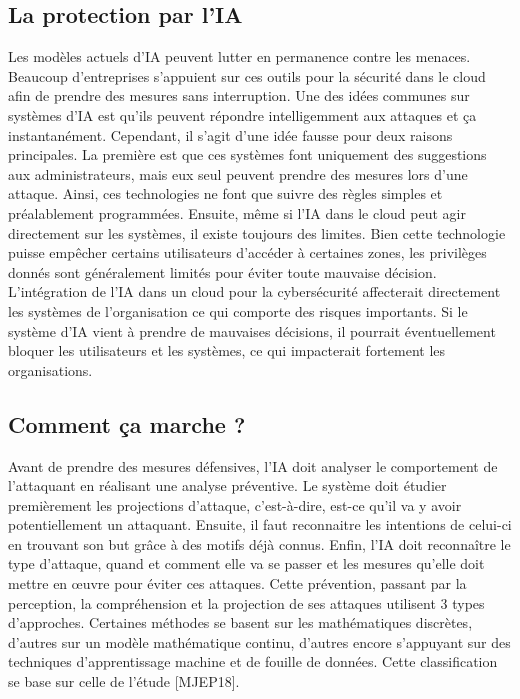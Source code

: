 \documentclass[a4paper, 12pt]{article}
\begin{document}
\begin{spacing}{1.1}
    \subsection{La protection par l'IA}
      Les modèles actuels d'IA peuvent lutter en permanence contre les
      menaces. Beaucoup d’entreprises s'appuient sur ces outils pour la sécurité
      dans le cloud afin de prendre des mesures sans interruption. Une des idées
      communes sur systèmes d'IA est qu'ils peuvent répondre intelligemment aux
      attaques et ça instantanément. Cependant, il s'agit d'une idée fausse pour
      deux raisons principales. La première est que ces systèmes font uniquement
      des suggestions aux administrateurs, mais eux seul peuvent prendre des
      mesures lors d'une attaque. Ainsi, ces technologies ne font que suivre des
      règles simples et préalablement programmées. Ensuite, même si l’IA dans le
      cloud peut agir directement sur les systèmes, il existe toujours des
      limites. Bien cette technologie puisse empêcher certains utilisateurs
      d'accéder à certaines zones, les privilèges donnés sont généralement
      limités pour éviter toute mauvaise décision. \\

      L’intégration de l’IA dans un cloud pour la cybersécurité affecterait
      directement les systèmes de l’organisation ce qui comporte des risques
      importants. Si le système d'IA vient à prendre de mauvaises décisions, il
      pourrait éventuellement bloquer les utilisateurs et les systèmes, ce qui
      impacterait fortement les organisations.

    \subsection{Comment ça marche ?}
      Avant de prendre des mesures défensives, l’IA doit analyser le
      comportement de l’attaquant en réalisant une analyse préventive. Le
      système doit étudier premièrement les projections d’attaque, c’est-à-dire,
      est-ce qu’il va y avoir potentiellement un attaquant. Ensuite, il faut
      reconnaitre les intentions de celui-ci en trouvant son but grâce à des
      motifs déjà connus. Enfin, l’IA doit reconnaître le type d’attaque, quand
      et comment elle va se passer et les mesures qu’elle doit mettre en œuvre
      pour éviter ces attaques. Cette prévention, passant par la perception, la
      compréhension et la projection de ses attaques utilisent 3 types
      d’approches. Certaines méthodes se basent sur les mathématiques discrètes,
      d'autres sur un modèle mathématique continu, d'autres encore s'appuyant
      sur des techniques d'apprentissage machine et de fouille de données. Cette
      classification se base sur celle de l'étude [MJEP18]. \\



\end{spacing}
\end{document}
